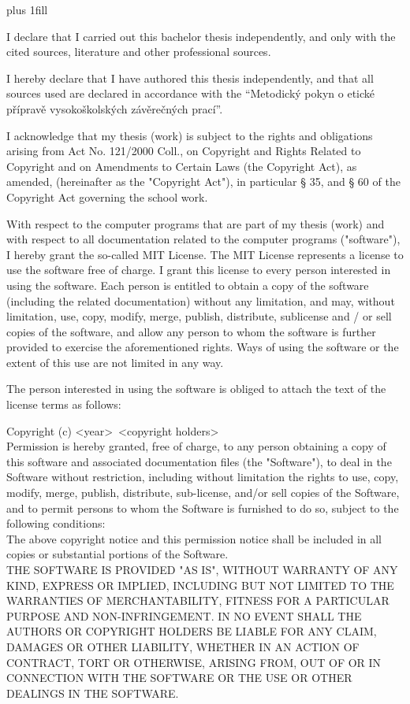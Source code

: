 \openright
\hypersetup{pageanchor=true}
\pagestyle{plain}
\vglue 0pt plus 1fill

\noindent
I declare that I carried out this bachelor thesis independently, and only with the cited
sources, literature and other professional sources.

\medskip\noindent
I hereby declare that I have authored this thesis independently, and that all sources used are declared in accordance with the “Metodický pokyn o etické přípravě vysokoškolských závěrečných prací”.

I acknowledge that my thesis (work) is subject to the rights and obligations arising from Act No. 121/2000 Coll., on Copyright and Rights Related to Copyright and on Amendments to Certain Laws (the Copyright Act), as amended, (hereinafter as the "Copyright Act"), in particular § 35, and § 60 of the Copyright Act governing the school work.

With respect to the computer programs that are part of my thesis (work) and with respect to all documentation related to the computer programs ("software"), I hereby grant the so-called MIT License. 
The MIT License represents a license to use the software free of charge. I grant this license to every person interested in using the software. Each person is entitled to obtain a copy of the software (including the related documentation) without any limitation, and may, without limitation, use, copy, modify, merge, publish, distribute, sublicense and / or sell copies of the software, and allow any person to whom the software is further provided to exercise the aforementioned rights. Ways of using the software or the extent of this use are not limited in any way.

The person interested in using the software is obliged to attach the text of the license terms as follows:

Copyright (c) \textless year\textgreater \  \textless copyright holders\textgreater \\
Permission is hereby granted, free of charge, to any person
obtaining a copy of this software and associated documentation
files (the "Software"), to deal in the Software without
restriction, including without limitation the rights to use,
copy, modify, merge, publish, distribute, sub-license, and/or sell
copies of the Software, and to permit persons to whom the
Software is furnished to do so, subject to the following
conditions: \\
The above copyright notice and this permission notice shall be
included in all copies or substantial portions of the Software. \\
THE SOFTWARE IS PROVIDED "AS IS", WITHOUT WARRANTY OF ANY KIND,
EXPRESS OR IMPLIED, INCLUDING BUT NOT LIMITED TO THE WARRANTIES
OF MERCHANTABILITY, FITNESS FOR A PARTICULAR PURPOSE AND
NON-INFRINGEMENT. IN NO EVENT SHALL THE AUTHORS OR COPYRIGHT
HOLDERS BE LIABLE FOR ANY CLAIM, DAMAGES OR OTHER LIABILITY,
WHETHER IN AN ACTION OF CONTRACT, TORT OR OTHERWISE, ARISING
FROM, OUT OF OR IN CONNECTION WITH THE SOFTWARE OR THE USE OR
OTHER DEALINGS IN THE SOFTWARE.

